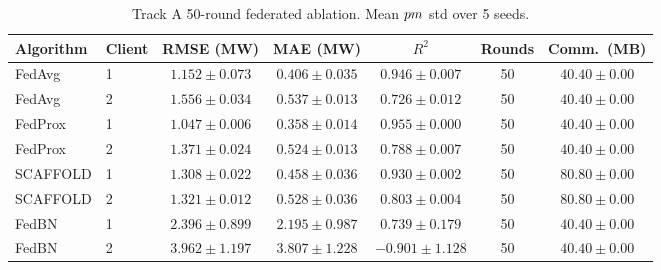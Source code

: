 \begin{table}[t]
\centering
\small
\begin{tabular}{llccccc}
\toprule
Algorithm & Client & RMSE (MW) & MAE (MW) & $R^2$ & Rounds & Comm.\ (MB) \\
\midrule
FedAvg & 1 & $1.152 \pm 0.073$ & $0.406 \pm 0.035$ & $0.946 \pm 0.007$ & 50 & $40.40 \pm 0.00$ \\
FedAvg & 2 & $1.556 \pm 0.034$ & $0.537 \pm 0.013$ & $0.726 \pm 0.012$ & 50 & $40.40 \pm 0.00$ \\
FedProx & 1 & $1.047 \pm 0.006$ & $0.358 \pm 0.014$ & $0.955 \pm 0.000$ & 50 & $40.40 \pm 0.00$ \\
FedProx & 2 & $1.371 \pm 0.024$ & $0.524 \pm 0.013$ & $0.788 \pm 0.007$ & 50 & $40.40 \pm 0.00$ \\
SCAFFOLD & 1 & $1.308 \pm 0.022$ & $0.458 \pm 0.036$ & $0.930 \pm 0.002$ & 50 & $80.80 \pm 0.00$ \\
SCAFFOLD & 2 & $1.321 \pm 0.012$ & $0.528 \pm 0.036$ & $0.803 \pm 0.004$ & 50 & $80.80 \pm 0.00$ \\
FedBN & 1 & $2.396 \pm 0.899$ & $2.195 \pm 0.987$ & $0.739 \pm 0.179$ & 50 & $40.40 \pm 0.00$ \\
FedBN & 2 & $3.962 \pm 1.197$ & $3.807 \pm 1.228$ & $-0.901 \pm 1.128$ & 50 & $40.40 \pm 0.00$ \\
\bottomrule
\end{tabular}
\caption{Track A 50-round federated ablation. Mean $\\pm$ std over 5 seeds.}
\label{tab:track-a-r50}
\end{table}
